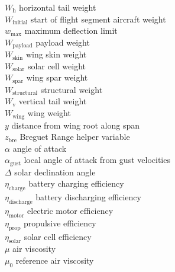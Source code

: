 \begin{multicols}{2}
\begin{tabbing}
$W_{\text{h}}$ \> horizontal tail weight \\ %
$W_{\text{initial}}$ \> start of flight segment aircraft weight \\ %
$w_{\text{max}}$ \> maximum deflection limit \\ %
$W_{\text{payload}}$ \> payload weight \\ %
$W_{\text{skin}}$ \> wing skin weight \\ %
$W_{\text{solar}}$ \> solar cell weight \\ %
$W_{\text{spar}}$ \> wing spar weight \\ %
$W_{\text{structural}}$ \> structural weight \\ %
$W_{\text{v}}$ \> vertical tail weight \\ %
$W_{\text{wing}}$ \> wing weight \\ %
$y$ \> distance from wing root along span \\ %
$z_{\text{bre}}$ \> Breguet Range helper variable \\
$\alpha$ \> angle of attack \\
$\alpha_{\text{gust}}$ \> local angle of attack from gust velocities \\ %
$\Delta$ \> solar declination angle \\
$\eta_{\text{charge}}$ \> battery charging efficiency \\
$\eta_{\text{discharge}}$ \> battery discharging efficiency \\
$\eta_{\text{motor}}$ \> electric motor efficiency \\
$\eta_{\text{prop}}$ \> propulsive efficiency \\
$\eta_{\text{solar}}$ \> solar cell efficiency \\
$\mu$ \> air viscosity \\ %
$\mu_0$ \> reference air viscosity \\ %

\end{tabbing}
\end{multicols}
